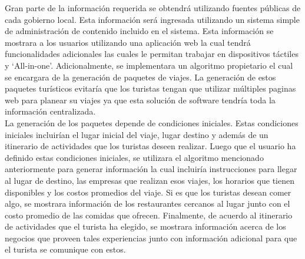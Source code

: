 \documentclass{article}
\begin{document}
Gran parte de la información requerida se obtendrá utilizando fuentes públicas
de cada gobierno local. Esta información será ingresada utilizando un sistema
simple de administración de contenido incluido en el sistema. Esta información
se mostrara a los usuarios utilizando una aplicación web la cual tendrá funcionalidades
adicionales las cuales le permitan trabajar en dispositivos táctiles y `All-in-one'.
Adicionalmente, se implementara un algoritmo propietario el cual se encargara
de la generación de paquetes de viajes. La generación de estos paquetes turísticos
evitaría que los turistas tengan que utilizar múltiples paginas web para planear
su viajes ya que esta solución de software tendría toda la información centralizada.\\
La generación de los paquetes depende de condiciones iniciales. Estas condiciones
iniciales incluirían el lugar inicial del viaje, lugar destino y además de un
itinerario de actividades que los turistas deseen realizar. Luego que el usuario
ha definido estas condiciones iniciales, se utilizara el algoritmo mencionado
anteriormente para generar información la cual incluiría instrucciones para llegar
al lugar de destino, las empresas que realizan esos viajes, los horarios que
tienen disponibles y los costos promedios del viaje. Si es que los turistas desean
comer algo, se mostrara información de los restaurantes cercanos al lugar junto con
el costo promedio de las comidas que ofrecen. Finalmente, de acuerdo al itinerario
de actividades que el turista ha elegido, se mostrara información acerca de los
negocios que proveen tales experiencias junto con información adicional para que
el turista se comunique con estos.
\end{document}
